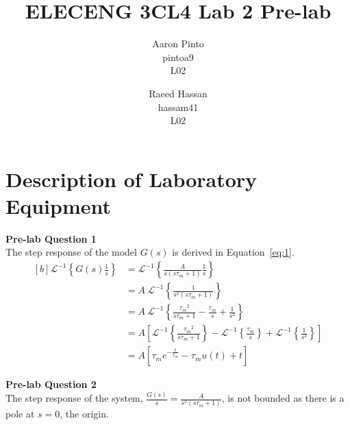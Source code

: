 \documentclass[12pt]{article}
\title{ELECENG 3CL4 Lab 2 Pre-lab}
\author{
    Aaron Pinto \\
    pintoa9 \\
    L02
    \and
    Raeed Hassan \\
    hassam41 \\
    L02
}
\begin{document}
\maketitle
\clearpage

\section{Description of Laboratory Equipment}
\textbf{Pre-lab Question 1} \\ %
The step response of the model $G(s)$ is derived in Equation~\ref{eq:1}.
\begin{equation} \label{eq:1}
\begin{aligned}[b]
    \mathscr{L}^{-1} \left\{ G(s) \frac{1}{s} \right\} &= \mathscr{L}^{-1} \left\{ \frac{A} {s(s\tau_m + 1)} \frac{1}{s} \right\} \\
    &= A \ \mathscr{L}^{-1} \left\{ \frac{1} {s^2(s\tau_m + 1)} \right\} \\
    &= A \ \mathscr{L}^{-1} \left\{ \frac{{\tau_m}^2} {s\tau_m + 1} - \frac{\tau_m}{s} + \frac{1}{s^2} \right\} \\
    &= A \left[ \mathscr{L}^{-1} \left\{ \frac{{\tau_m}^2} {s\tau_m + 1} \right\} - \mathscr{L}^{-1} \left\{ \frac{\tau_m}{s} \right\} + \mathscr{L}^{-1} \left\{ \frac{1}{s^2} \right\} \right] \\
    &= A \left[ \tau_m e^{-\frac{t}{\tau_m}} - \tau_m u(t) + t \right]
\end{aligned}
\end{equation}

\textbf{Pre-lab Question 2} \\ %
The step response of the system, $\frac{G(s)}{s} = \frac{A}{s^2(s\tau_m+1)}$, is not bounded as there is a pole at $s = 0$, the origin.
\end{document}
